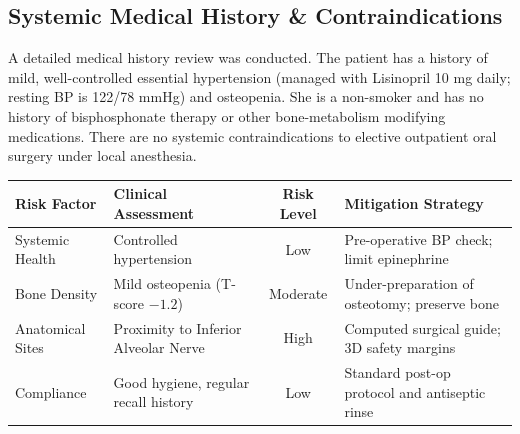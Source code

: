 \subsection{Systemic Medical History \& Contraindications}
A detailed medical history review was conducted. The patient has a history of mild, well-controlled essential hypertension (managed with Lisinopril 10 mg daily; resting BP is 122/78 mmHg) and osteopenia. She is a non-smoker and has no history of bisphosphonate therapy or other bone-metabolism modifying medications. There are no systemic contraindications to elective outpatient oral surgery under local anesthesia.

\vspace{0.3cm}

\begin{tcolorbox}[riskbox, title={\faExclamationTriangle\ Risk Factor Matrix}]
    \begin{tabularx}{\textwidth}{l X c l}
        \toprule
        \textbf{Risk Factor} & \textbf{Clinical Assessment} & \textbf{Risk Level} & \textbf{Mitigation Strategy} \\
        \midrule
        Systemic Health & Controlled hypertension & Low & Pre-operative BP check; limit epinephrine \\
        Bone Density & Mild osteopenia (T-score $-1.2$) & Moderate & Under-preparation of osteotomy; preserve bone \\
        Anatomical Sites & Proximity to Inferior Alveolar Nerve & High & Computed surgical guide; 3D safety margins \\
        Compliance & Good hygiene, regular recall history & Low & Standard post-op protocol and antiseptic rinse \\
        \bottomrule
    \end{tabularx}
\end{tcolorbox}
